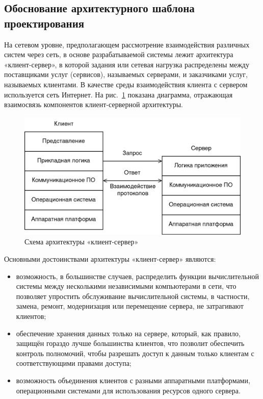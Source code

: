 \subsection{Обоснование архитектурного шаблона проектирования}
\label{sub:system-design:architectural-pattern-design}

На сетевом уровне, предполагающем рассмотрение взаимодействия различных систем через сеть, в основе разрабатываемой системы лежит архитектура «клиент-сервер», в которой задания или сетевая нагрузка распределены между поставщиками услуг (сервисов), называемых серверами, и заказчиками услуг, называемых клиентами. В качестве среды взаимодействия клиента с сервером используется сеть Интернет. На рис.~\ref{fig:client-server-architecture} показана диаграмма, отражающая взаимосвязь компонентов клиент-серверной архитектуры.

\begin{figure}[h]
\centering
    \includegraphics[width=0.75\linewidth]{assets/client-server-architecture.png}
    \caption{Схема архитектуры «клиент-сервер»}
    \label{fig:client-server-architecture}
\end{figure}

Основными достоинствами архитектуры «клиент-сервер» являются:

\begin{itemize}
    \item возможность, в большинстве случаев, распределить функции вычислительной системы между несколькими независимыми компьютерами в сети, что позволяет упростить обслуживание вычислительной системы, в частности, замена, ремонт, модернизация или перемещение сервера, не затрагивают клиентов;
    \item обеспечение хранения данных только на сервере, который, как правило, защищён гораздо лучше большинства клиентов, что позволит обеспечить контроль полномочий, чтобы разрешать доступ к данным только клиентам с соответствующими правами доступа;
    \item возможность объединения клиентов с разными аппаратными платформами, операционными системами для использования ресурсов одного сервера.
\end{itemize}

